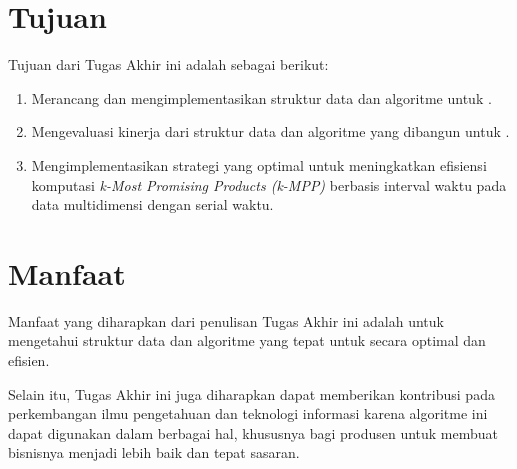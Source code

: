 \section{Tujuan}
\tab Tujuan dari Tugas Akhir ini adalah sebagai berikut:

\begin{enumerate}
	\item Merancang dan mengimplementasikan struktur data dan algoritme untuk \problem.
	\item Mengevaluasi kinerja dari struktur data dan algoritme yang dibangun untuk \problem.
	\item Mengimplementasikan strategi yang optimal untuk meningkatkan efisiensi komputasi \textit{k-Most Promising Products (k-MPP)} berbasis interval waktu pada data multidimensi dengan serial waktu.
\end{enumerate}

\section{Manfaat}
\tab Manfaat yang diharapkan dari penulisan Tugas Akhir ini adalah untuk mengetahui struktur data dan algoritme yang tepat untuk \problem secara optimal dan efisien.

Selain itu, Tugas Akhir ini juga diharapkan dapat memberikan kontribusi pada perkembangan ilmu pengetahuan dan teknologi informasi karena algoritme ini dapat digunakan dalam berbagai hal, khususnya bagi produsen untuk membuat bisnisnya menjadi lebih baik dan tepat sasaran.

